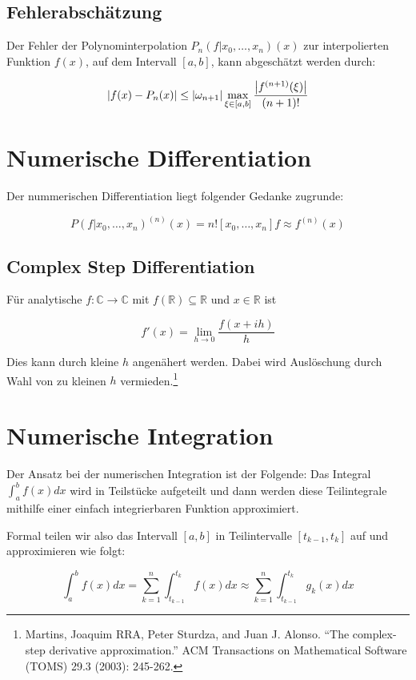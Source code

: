\documentclass[a4paper,parskip=half*,DIV=15,fontsize=11pt]{scrartcl}
\DeclarePairedDelimiter\abs{\lvert}{\rvert}
\begin{document}
\subsection{Fehlerabschätzung}
Der Fehler der Polynominterpolation $P_n (f|x_0,\ldots,x_n) (x)$ zur interpolierten Funktion $f(x)$, auf dem Intervall $[a,b]$, kann abgeschätzt werden durch:

\[\abs*{f(x) - P_n (x)} \leq \abs*{\omega_{n+1}} \max_{\xi \in [a,b]} \frac{\abs*{f^{(n+1)}(\xi)}}{(n+1)!}\]

\section{Numerische Differentiation}

Der nummerischen Differentiation liegt folgender Gedanke zugrunde:

\[P(f|x_0, \ldots, x_n)^{(n)} (x) = n![x_0,\ldots,x_n]f \approx f^{(n)} (x)\]

\subsection{Complex Step Differentiation}

Für analytische $f: \mathbb{C} \to \mathbb{C}$ mit $f(\mathbb{R}) \subseteq \mathbb{R}$ und $x \in \mathbb{R}$ ist

\[ f'(x) = \lim_{h \to 0} \frac{f(x+ih)}{h} \]

Dies kann durch kleine $h$ angenähert werden. Dabei wird Auslöschung durch Wahl von zu kleinen $h$ vermieden.\footnote{Martins, Joaquim RRA, Peter Sturdza, and Juan J. Alonso. ``The complex-step derivative approximation.'' ACM Transactions on Mathematical Software (TOMS) 29.3 (2003): 245-262.}

\section{Numerische Integration}

Der Ansatz bei der numerischen Integration ist der Folgende: Das Integral $\int_a^b f(x) dx$ wird in Teilstücke aufgeteilt und dann werden diese Teilintegrale mithilfe einer einfach integrierbaren Funktion approximiert.

Formal teilen wir also das Intervall $[a, b]$ in Teilintervalle $[t_{k-1}, t_k]$ auf und approximieren wie folgt:

\[
	\int_a^b f(x) dx = \sum_{k=1}^n \int_{t_{k-1}}^{t_k} f(x) dx \approx \sum_{k=1}^n \int_{t_{k-1}}^{t_k} g_k(x)dx
\]
\end{document}
